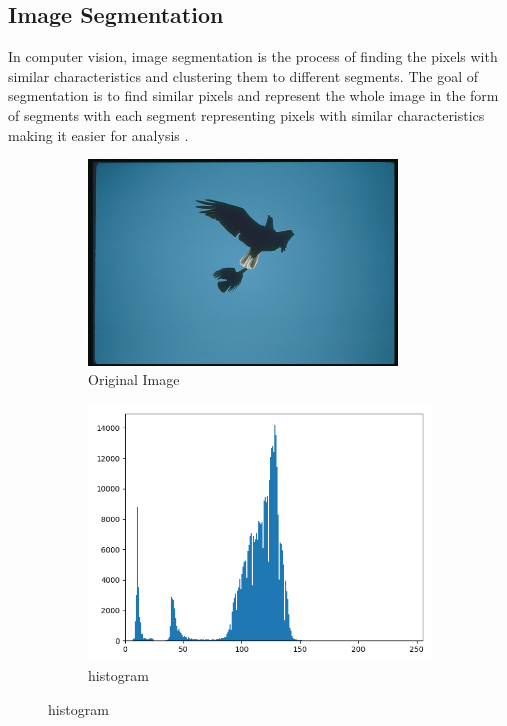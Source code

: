 \documentclass[conference]{IEEEtran}
\begin{document}
\subsection{Image Segmentation}
In computer vision, image segmentation is the process of finding the pixels with similar characteristics and clustering them to different segments. The goal of segmentation is to find similar pixels and represent the whole image in the form of segments with each segment representing pixels with similar characteristics making it easier for analysis \cite{b12}\cite{b13}.
\begin{figure}
    \centering
    \begin{subfigure}{.5\linewidth}
      \centering
      \includegraphics[width=0.9\textwidth]{imgresults/eagle_original.png}
      \caption{Original Image}
      \label{fig:sub1}
    \end{subfigure}%
    \begin{subfigure}{.5\linewidth}
        \centering
        \includegraphics[width=1\textwidth]{imgresults/eagle_hist.png}
        \caption{histogram}
        \label{fig:histogram}
    \end{subfigure}
    \label{fig:sub}



\end{figure}
\end{document}
